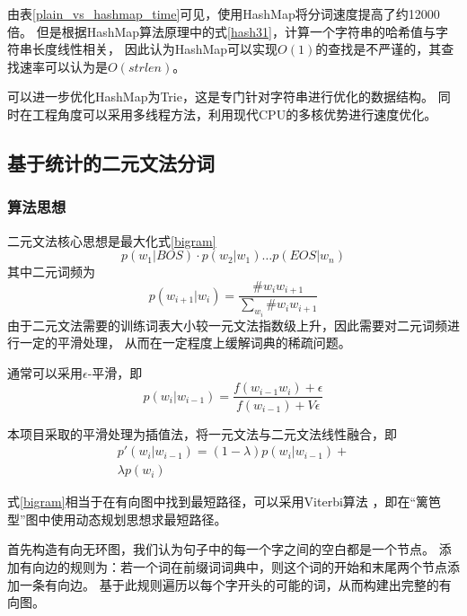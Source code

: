 由表\ref{plain_vs_hashmap_time}可见，使用HashMap将分词速度提高了约12000倍。
但是根据HashMap算法原理中的式\ref{hash31}，计算一个字符串的哈希值与字符串长度线性相关，
因此认为HashMap可以实现$O(1)$的查找是不严谨的，其查找速率可以认为是$O(strlen)$。

可以进一步优化HashMap为Trie，这是专门针对字符串进行优化的数据结构\citep{bodon2003trie}。
同时在工程角度可以采用多线程方法，利用现代CPU的多核优势进行速度优化。

\subsection{基于统计的二元文法分词}

\subsubsection{算法思想}

二元文法核心思想是最大化式\ref{bigram}
\begin{equation}
  p\left(w_1|BOS\right) \cdot p\left(w_2|w_1\right) \ldots p\left(EOS|w_n\right)
  \label{bigram}
\end{equation}
其中二元词频为
\begin{equation}
  p\left(w_{i+1}|w_i\right) = \dfrac{\# w_i w_{i+1}}{\sum_{w_i} \# w_i w_{i+1}}
\end{equation}
由于二元文法需要的训练词表大小较一元文法指数级上升，因此需要对二元词频进行一定的平滑处理，
从而在一定程度上缓解词典的稀疏问题。

通常可以采用$\epsilon$-平滑，即
\begin{equation}
  p(w_i|w_{i-1})=\dfrac{f(w_{i-1} w_i)+\epsilon}{f(w_{i-1})+V \epsilon}
\end{equation}

本项目采取的平滑处理为插值法，将一元文法与二元文法线性融合，即
\begin{equation}
  \begin{split}
    p'\left(w_i|w_{i-1}\right)=
    \left(1-\lambda\right)p\left(w_i|w_{i-1}\right)+\\
    \lambda p\left(w_i\right)
  \end{split}
\end{equation}

式\ref{bigram}相当于在有向图中找到最短路径，可以采用Viterbi算法
\citep{forney1973viterbi}，即在“篱笆型”图中使用动态规划思想求最短路径。

首先构造有向无环图，我们认为句子中的每一个字之间的空白都是一个节点。
添加有向边的规则为：若一个词在前缀词词典中，则这个词的开始和末尾两个节点添加一条有向边。
基于此规则遍历以每个字开头的可能的词，从而构建出完整的有向图。

